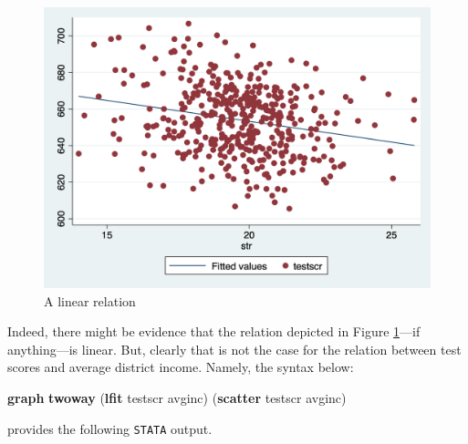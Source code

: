 \documentclass[
]{book}
\newenvironment{Shaded}{\begin{snugshade}}{\end{snugshade}}
\newcommand{\KeywordTok}[1]{\textcolor[rgb]{0.13,0.29,0.53}{\textbf{#1}}}
\newcommand{\NormalTok}[1]{#1}
\begin{document}
\begin{figure}

{\centering \includegraphics[width=600px]{./figures/scatterlfit} 

}

\caption{A linear relation}\label{fig:scatterlfitcaschool}
\end{figure}

Indeed, there might be evidence that the relation depicted in Figure \ref{fig:scatterlfitcaschool}---if anything---is linear. But, clearly that is not the case for the relation between test scores and average district income. Namely, the syntax below:

\begin{Shaded}
\begin{Highlighting}[]
\KeywordTok{graph} \KeywordTok{twoway}\NormalTok{ (}\KeywordTok{lfit}\NormalTok{ testscr avginc) (}\KeywordTok{scatter}\NormalTok{ testscr avginc)}
\end{Highlighting}
\end{Shaded}

provides the following \texttt{STATA} output.
\end{document}
